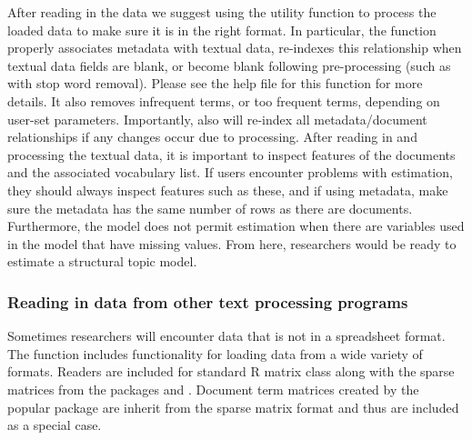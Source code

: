 \documentclass[nojss]{jss}
\begin{document}
\begin{Schunk}
\end{Schunk}

After reading in the data we suggest using the utility function  to process the loaded data to make sure it is in the right format. In particular, the  function properly associates metadata with textual data, re-indexes this relationship when textual data fields are blank, or become blank following pre-processing (such as with stop word removal). Please see the help file for this function for more details. It also removes infrequent terms, or too frequent terms, depending on user-set parameters. Importantly,  also will re-index all metadata/document relationships if any changes occur due to processing. After reading in and processing the textual data, it is important to inspect features of the documents and the associated vocabulary list. If users encounter problems with estimation, they should always inspect features such as these, and if using metadata, make sure the metadata has the same number of rows as there are documents. Furthermore, the model does not permit estimation when there are variables used in the model that have missing values. From here, researchers would be ready to estimate a structural topic model.

\subsubsection{Reading in data from other text processing programs}

Sometimes researchers will encounter data that is not in a spreadsheet format. The  function includes functionality for loading data from a wide variety of formats.  Readers are included for standard R matrix class along with the sparse matrices from the packages  and .  Document term matrices created by the popular package  are inherit from the  sparse matrix format and thus are included as a special case.    
\end{document}
